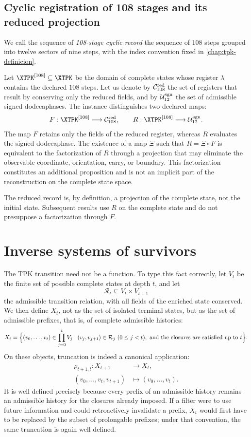 \subsection{Cyclic registration of 108 stages and its reduced projection}

We call the sequence of \emph{108-stage cyclic record} the sequence of
\(108\) steps grouped into twelve sectors of nine steps, with the index
convention fixed in \cref{chap:tpk-definicion}.

Let \(\XTPK^{[108]}\subseteq\XTPK\) be the domain of complete states whose
register \(\lambda\) contains the declared \(108\) steps. Let us denote by
\(\mathcal C_{108}^{\rm red}\) the set of registers that result by
conserving only the reduced fields, and by \(\mathcal U_{12}^{\rm sgn}\) the
set of admissible signed dodecaphases. The instance distinguishes two declared maps:
\[
F:\XTPK^{[108]}\longrightarrow\mathcal C_{108}^{\rm red},
\qquad
R:\XTPK^{[108]}\longrightarrow\mathcal U_{12}^{\rm sgn}.
\]
The map \(F\) retains only the fields of the reduced register, whereas \(R\) evaluates the signed dodecaphase. The existence of a map \(\Xi\) such that \(R=\Xi\circ F\) is equivalent to the factorization of \(R\) through a projection that may eliminate the observable coordinate, orientation, carry, or boundary. This factorization constitutes an additional proposition and is not an implicit part of the reconstruction on the complete state space.

The reduced record is, by definition, a projection of the complete state,
not the initial state. Subsequent results use \(R\) on the
complete state and do not presuppose a factorization through \(F\).

\section{Inverse systems of survivors}

The TPK transition need not be a function. To type this fact correctly,
let \(V_t\) be the finite set of possible complete states at
depth \(t\), and let
\[
\mathcal R_t\subseteq V_t\times V_{t+1}
\]
the admissible transition relation, with all fields of the
enriched state conserved. We then define \(X_t\), not as the set of
isolated terminal states, but as the set of admissible prefixes, that is,
of complete admissible histories:
\[
X_t=
\Bigl\{
(v_0,\ldots,v_t)\in\prod_{j=0}^{t}V_j:
(v_j,v_{j+1})\in\mathcal R_j\ (0\le j<t),
\ \text{and the closures are satisfied up to }t
\Bigr\}.
\]
On these objects, truncation is indeed a canonical application:
\[
\begin{aligned}
\rho_{t+1,t}:X_{t+1}&\longrightarrow X_t,\\
(v_0,\ldots,v_t,v_{t+1})&\longmapsto(v_0,\ldots,v_t).
\end{aligned}
\]
It is well defined precisely because every prefix of an admissible history remains an admissible history for the closures already imposed. If a filter were to use future information and could retroactively invalidate a prefix, \(X_t\) would first have to be replaced by the subset of prolongable prefixes; under that convention, the same truncation is again well defined.


